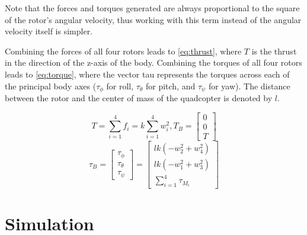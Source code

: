 \documentclass[letterpaper,12pt,titlepage,oneside,final]{book}
\begin{document}
Note that the forces and torques generated are always proportional to the square of the rotor's angular velocity, thus working with this term instead of the angular velocity itself is simpler. %

Combining the forces of all four rotors leads to \eqref{eq:thrust}, where $T$ is the thrust in the direction of the z-axis of the body. 
Combining the torques of all four rotors leads to \eqref{eq:torque}, where the vector tau represents the torques across each of the principal body axes ($\tau_{\phi}$ for roll, $\tau_{\theta}$ for pitch, and $\tau_{\psi}$ for yaw). 
The distance between the rotor and the center of mass of the quadcopter is denoted by $l$. 

\begin{equation} \label{eq:thrust}
T = \sum_{i=1}^{4} f_{i} = k\sum_{i=1}^{4} w^{2}_{i} , T_{B} = 
\begin{bmatrix}
0 \\
0 \\
T
\end{bmatrix}
\end{equation}
\begin{equation} \label{eq:torque}
\tau_{B} = 
\begin{bmatrix}
\tau_{\phi} \\
\tau_{\theta} \\
\tau_{\psi}
\end{bmatrix}
=
\begin{bmatrix}
lk(-w_{2}^{2}+w_{4}^{2}) \\
lk(-w_{1}^{2}+w_{3}^{2}) \\
\sum_{i=1}^{4}\tau_{M_{i}}
\end{bmatrix}
\end{equation}



\section{Simulation}

\end{document}
